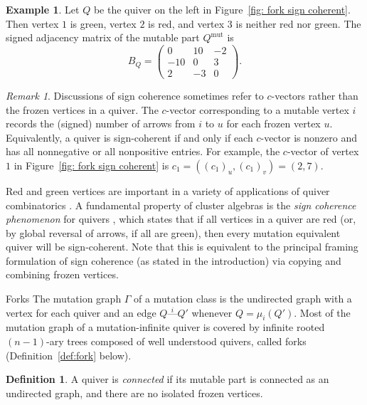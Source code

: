 \documentclass[12pt]{amsart}
\makeatletter
\theoremstyle{definition}
\newtheorem{defn}[thm]{Definition}
\newtheorem{exmp}[thm]{Example}
\theoremstyle{remark}
\newtheorem{rem}[thm]{Remark}
\numberwithin{equation}{section}
\newcommand{\mut} {\text{mut}}
\def\subsection{\@startsection{subsection}{3}%
  \z@{.5\linespacing\@plus.7\linespacing}{.1\linespacing}%
  {\bfseries}}
\makeatother
\begin{document}
\begin{exmp}
Let $Q$ be the quiver on the left in Figure~\ref{fig: fork sign coherent}.
Then vertex $1$ is green, vertex $2$ is red, and vertex $3$ is neither red nor green.
The signed adjacency matrix of the mutable part $Q^{\mut}$ is 
$$B_Q = \begin{pmatrix} 0 & 10 & -2 \\ -10 & 0 & 3 \\ 2 & -3 & 0 \end{pmatrix}.$$
\end{exmp}

\begin{rem}
Discussions of sign coherence sometimes refer to $c$-vectors rather than the frozen vertices in a quiver. 
The $c$-vector corresponding to a mutable vertex $i$ records the (signed) number of arrows from $i$ to $u$ for each frozen vertex $u$.  Equivalently, a quiver is sign-coherent if and only if each $c$-vector is nonzero and has all nonnegative or all nonpositive entries. 
For example, the $c$-vector of vertex $1$ in Figure~\ref{fig: fork sign coherent} is $c_1 = ((c_1)_u,(c_1)_v) = (2,7)$. 
\end{rem}


Red and green vertices are important in a variety of applications of quiver combinatorics \cite{KellerGreenSurvey}.  A fundamental property of cluster algebras is the \emph{sign coherence phenomenon} for quivers \cite{DWZ2}, which states that if all vertices in a quiver are red (or, by global reversal of arrows, if all are green), then every mutation equivalent quiver will be sign-coherent.  Note that this is equivalent to the principal framing formulation of sign coherence (as stated in the introduction) via copying and combining frozen vertices.


\subsection{Forks}
The mutation graph $\Gamma$ of a mutation class is the undirected graph with a vertex for each quiver and an edge $Q \stackrel{i}{\text{---}} Q'$ whenever $Q = \mu_i(Q')$.
Most of the mutation graph of a mutation-infinite quiver is covered by infinite rooted $(n-1)$-ary trees composed of well understood quivers, called forks (Definition~\ref{def:fork} below).

\begin{defn}
A quiver is \emph{connected} if its mutable part is connected as an undirected graph, and there are no isolated frozen vertices.
\end{defn}
\end{document}
